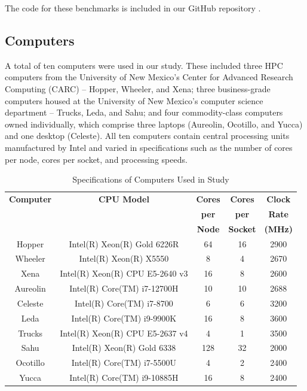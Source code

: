 \documentclass{article}
\begin{document}
The code for these benchmarks is included in our GitHub repository \cite{repo}.

\subsection{Computers}
A total of ten computers were used in our study. These included three HPC computers from the University of New Mexico's Center for Advanced Research Computing (CARC) – Hopper, Wheeler, and Xena; three business-grade computers housed at the University of New Mexico’s computer science department – Trucks, Leda, and Sahu; and four commodity-class computers owned individually, which comprise three laptops (Aureolin, Ocotillo, and Yucca) and one desktop (Celeste). All ten computers contain central processing units manufactured by Intel and varied in specifications such as the number of cores per node, cores per socket, and processing speeds.
\begin{table}[h!]
\centering
\begin{tabular}{|c|c|c|c|c|}
\hline
\textbf{Computer} & \textbf{CPU Model} & \textbf{Cores} & \textbf{Cores} & \textbf{Clock} \\
 & & \textbf{per} & \textbf{per} & \textbf{Rate} \\
 & & \textbf{Node} & \textbf{Socket} & \textbf{(MHz)} \\
\hline
Hopper & Intel(R) Xeon(R) Gold 6226R & 64 & 16 & 2900 \\
Wheeler & Intel(R) Xeon(R) X5550 & 8 & 4 & 2670 \\
Xena & Intel(R) Xeon(R) CPU E5-2640 v3 & 16 & 8 & 2600 \\
Aureolin & Intel(R) Core(TM) i7-12700H & 10 & 10 & 2688 \\
Celeste & Intel(R) Core(TM) i7-8700 & 6 & 6 & 3200 \\
Leda & Intel(R) Core(TM) i9-9900K & 16 & 8 & 3600 \\
Trucks & Intel(R) Xeon(R) CPU E5-2637 v4 & 4 & 1 & 3500 \\
Sahu & Intel(R) Xeon(R) Gold 6338 & 128 & 32 & 2000 \\
Ocotillo & Intel(R) Core(TM) i7-5500U & 4 & 2 & 2400 \\
Yucca & Intel(R) Core(TM) i9-10885H & 16 & 8 & 2400 \\
\hline
\end{tabular}
\caption{Specifications of Computers Used in Study}
\label{table:computers}
\end{table}
\end{document}
